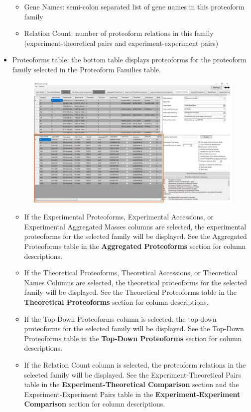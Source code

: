 \begin{itemize}
\begin{itemize}
	\item Gene Names: semi-colon separated list of gene names in this proteoform family
	\item Relation Count: number of proteoform relations in this family (experiment-theoretical pairs and experiment-experiment pairs)
\end{itemize}
\item Proteoforms table: the bottom table displays proteoforms for the proteoform family selected in the Proteoform Families table. 
	\begin{figure}[h]
\centering
\includegraphics[scale=0.5]{figures/families3.jpg}
\end{figure}
\begin{itemize}
\item If the Experimental Proteoforms, Experimental Accessions, or Experimental Aggregated Masses columns are selected, the experimental proteoforms for the selected family will be displayed. See the Aggregated Proteoforms table in the \textbf{Aggregated Proteoforms} section for column descriptions. 
\item If the Theoretical Proteoforms, Theoretical Accessions, or Theoretical Names Columns are selected, the theoretical proteoforms for the selected family will be displayed. See the Theoretical Proteoforms table in the \textbf{Theoretical Proteoforms} section for column descriptions.
\item If the Top-Down Proteoforms column is selected, the top-down proteoforms for the selected family will be displayed. See the Top-Down Proteoforms table in the \textbf{Top-Down Proteoforms} section for column descriptions.
\item If the Relation Count column is selected, the proteoform relations in the selected family will be displayed. See the Experiment-Theoretical Pairs table in the \textbf{Experiment-Theoretical Comparison} section and the Experiment-Experiment Pairs table in the \textbf{Experiment-Experiment Comparison} section for column descriptions.

\end{itemize}
\end{itemize}
